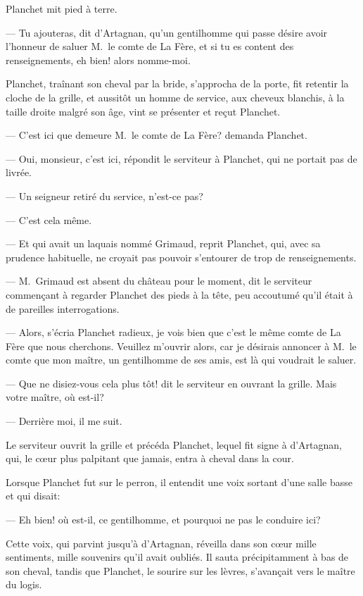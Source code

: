 Planchet mit pied à terre.

— Tu ajouteras, dit d'Artagnan, qu'un gentilhomme qui passe désire avoir l'honneur de saluer M.~le comte de La Fère, et si tu es content des renseignements, eh bien! alors nomme-moi.

Planchet, traînant son cheval par la bride, s'approcha de la porte, fit retentir la cloche de la grille, et aussitôt un homme de service, aux cheveux blanchis, à la taille droite malgré son âge, vint se présenter et reçut Planchet.

— C'est ici que demeure M.~le comte de La Fère? demanda Planchet.

— Oui, monsieur, c'est ici, répondit le serviteur à Planchet, qui ne portait pas de livrée.

— Un seigneur retiré du service, n'est-ce pas?

— C'est cela même.

— Et qui avait un laquais nommé Grimaud, reprit Planchet, qui, avec sa prudence habituelle, ne croyait pas pouvoir s'entourer de trop de renseignements.

— M.~Grimaud est absent du château pour le moment, dit le serviteur commençant à regarder Planchet des pieds à la tête, peu accoutumé qu'il était à de pareilles interrogations.

— Alors, s'écria Planchet radieux, je vois bien que c'est le même comte de La Fère que nous cherchons. Veuillez m'ouvrir alors, car je désirais annoncer à M.~le comte que mon maître, un gentilhomme de ses amis, est là qui voudrait le saluer.

— Que ne disiez-vous cela plus tôt! dit le serviteur en ouvrant la grille. Mais votre maître, où est-il?

— Derrière moi, il me suit.

Le serviteur ouvrit la grille et précéda Planchet, lequel fit signe à d'Artagnan, qui, le cœur plus palpitant que jamais, entra à cheval dans la cour.

Lorsque Planchet fut sur le perron, il entendit une voix sortant d'une salle basse et qui disait:

— Eh bien! où est-il, ce gentilhomme, et pourquoi ne pas le conduire ici?

Cette voix, qui parvint jusqu'à d'Artagnan, réveilla dans son cœur mille sentiments, mille souvenirs qu'il avait oubliés. Il sauta précipitamment à bas de son cheval, tandis que Planchet, le sourire sur les lèvres, s'avançait vers le maître du logis.

